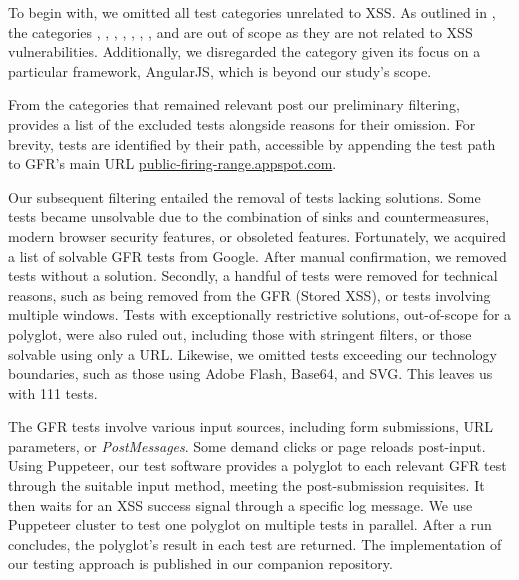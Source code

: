 \smallskip
To begin with, we omitted all test categories unrelated to XSS\@.
As outlined in , the categories , , , , , , , and  are out of scope as they are not related to XSS vulnerabilities. 
Additionally, we disregarded the  category given its focus on a particular framework, AngularJS, which is beyond our study's scope.

From the categories that remained relevant post our preliminary filtering,  provides a list of the excluded tests alongside reasons for their omission.
For brevity, tests are identified by their path, accessible by appending the test path to GFR's main URL {\small{}\url{public-firing-range.appspot.com}}.

Our subsequent filtering entailed the removal of tests lacking solutions.
Some tests became unsolvable due to the combination of sinks and countermeasures, modern browser security features, or obsoleted features.
Fortunately, we acquired a list of solvable GFR tests from Google.
After manual confirmation, we removed tests without a solution.
Secondly, a handful of tests were removed for technical reasons, such as being removed from the GFR (Stored XSS), 
or tests involving multiple windows.
Tests with exceptionally restrictive solutions, out-of-scope for a polyglot, were also ruled out, including those with stringent filters, or those solvable using only a URL\@.
Likewise, we omitted tests exceeding our technology boundaries, such as those using Adobe Flash, Base64, and SVG\@.
This leaves us with \num{111} tests.

The GFR tests involve various input sources, including form submissions, URL parameters, or \emph{PostMessages}.
Some demand clicks or page reloads post-input.
Using Puppeteer, our test software provides a polyglot to each relevant GFR test through the suitable input method, meeting the post-submission requisites.
It then waits for an XSS success signal through a specific log message.
We use Puppeteer cluster to test one polyglot on multiple tests in parallel.
After a run concludes, the polyglot's result in each test are returned.
The implementation of our testing approach is published in our companion repository.



